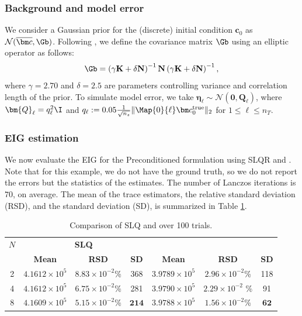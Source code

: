 \documentclass{aims} %
\theoremstyle{definition}
\begin{document}
%
\subsubsection*{Background and model error}
We consider a Gaussian prior for the (discrete) initial condition $\bm c_0$ as $\mathcal{N}(\overline{\bm c}, \Gb)$. Following \cite{Stuart_2010, VillaPetraGhattas21},  we define the covariance matrix $\Gb$ using an elliptic operator as follows:
%
\begin{align} \label{eq:prior_2d}
\Gb = \left(\gamma\mathbf{K} + \delta\mathbf{N}\right)^{-1}\mathbf{N} \left(\gamma\mathbf{K} +\delta\mathbf{N}\right)^{-1},
\end{align}
where $\gamma = 2.70$ and $\delta = 2.5$ are parameters controlling variance and correlation length of the prior. To simulate model error,  we take $\displaystyle  \bm\eta_\ell \sim \mathcal{N}(\bm 0, \bm Q_{\ell})$, where $\bm{Q}_{\ell} = q^2_\ell \I$ and $q_\ell := 0.05\frac{1}{\sqrt{n_{s}}}  \| \Map{0}{\ell} \bm c^{\text{true}}_0 \|_2$ for $1  \le \ell \le n_T$.  


\subsubsection*{EIG estimation}

We now evaluate the EIG for the Preconditioned formulation using SLQR and \xntrace. Note that for this example, we do not have the ground truth, so we do not report the errors but the statistics of the estimates.   
The number of Lanczos iterations is $70$, on average. The mean of the trace estimators,  the relative standard deviation (RSD), and the standard deviation (SD), is summarized in Table \ref{tab:estimator_comparison}. 


%
\begin{table}[ht!]
\centering
\begin{tabular}{c|ccc|ccc}
\hline
\textbf{$N$} & \multicolumn{3}{c|}{\textbf{SLQ}} & \multicolumn{3}{c}{\textbf{\xntrace{}}} \\ 
\textbf{} & \textbf{Mean} & \textbf{RSD} & \textbf{SD} & \textbf{Mean} & \textbf{RSD} & \textbf{SD}\\ \hline
2 & $4.1612 \times 10^{5}$ & $8.83 \times 10^{-2}$\%  & 368& $3.9789 \times 10^{5}$ & $2.96 \times 10^{-2}$\% & 118\\ \hline
4 & $4.1612 \times 10^{5}$ &  $6.75 \times 10^{-2}$\% & 281& $3.9790 \times 10^{5}$ & $2.29 \times 10^{-2}$ \% & 91\\ \hline
8 & $4.1609 \times 10^{5}$ &  $5.15 \times 10^{-2}$\% & $\bm{214}$& $3.9788 \times 10^{5}$ & $1.56 \times 10^{-2}$\% & $\bm{62}$\\ \hline
\end{tabular}
\caption{Comparison of SLQ and \xntrace{} over 100 trials.} 
\label{tab:estimator_comparison}
\end{table}
%
\end{document}

